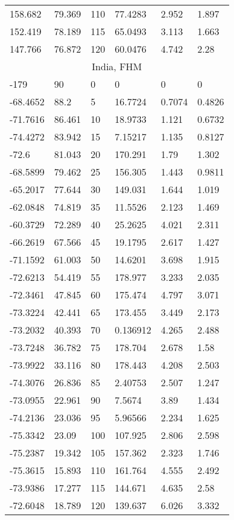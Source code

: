 \begin{longtable}[c]{@{}llllll@{}}
158.682 & 79.369 & 110 & 77.4283 & 2.952 & 1.897 \\
152.419 & 78.189 & 115 & 65.0493 & 3.113 & 1.663 \\
147.766 & 76.872 & 120 & 60.0476 & 4.742 & 2.28 \\
\multicolumn{6}{c}{India, FHM} \\
-179 & 90 & 0 & 0 & 0 & 0 \\
-68.4652 & 88.2 & 5 & 16.7724 & 0.7074 & 0.4826 \\
-71.7616 & 86.461 & 10 & 18.9733 & 1.121 & 0.6732 \\
-74.4272 & 83.942 & 15 & 7.15217 & 1.135 & 0.8127 \\
-72.6 & 81.043 & 20 & 170.291 & 1.79 & 1.302 \\
-68.5899 & 79.462 & 25 & 156.305 & 1.443 & 0.9811 \\
-65.2017 & 77.644 & 30 & 149.031 & 1.644 & 1.019 \\
-62.0848 & 74.819 & 35 & 11.5526 & 2.123 & 1.469 \\
-60.3729 & 72.289 & 40 & 25.2625 & 4.021 & 2.311 \\
-66.2619 & 67.566 & 45 & 19.1795 & 2.617 & 1.427 \\
-71.1592 & 61.003 & 50 & 14.6201 & 3.698 & 1.915 \\
-72.6213 & 54.419 & 55 & 178.977 & 3.233 & 2.035 \\
-72.3461 & 47.845 & 60 & 175.474 & 4.797 & 3.071 \\
-73.3224 & 42.441 & 65 & 173.455 & 3.449 & 2.173 \\
-73.2032 & 40.393 & 70 & 0.136912 & 4.265 & 2.488 \\
-73.7248 & 36.782 & 75 & 178.704 & 2.678 & 1.58 \\
-73.9922 & 33.116 & 80 & 178.443 & 4.208 & 2.503 \\
-74.3076 & 26.836 & 85 & 2.40753 & 2.507 & 1.247 \\
-73.0955 & 22.961 & 90 & 7.5674 & 3.89 & 1.434 \\
-74.2136 & 23.036 & 95 & 5.96566 & 2.234 & 1.625 \\
-75.3342 & 23.09 & 100 & 107.925 & 2.806 & 2.598 \\
-75.2387 & 19.342 & 105 & 157.362 & 2.323 & 1.746 \\
-75.3615 & 15.893 & 110 & 161.764 & 4.555 & 2.492 \\
-73.9386 & 17.277 & 115 & 144.671 & 4.635 & 2.58 \\
-72.6048 & 18.789 & 120 & 139.637 & 6.026 & 3.332 \\

\end{longtable}
